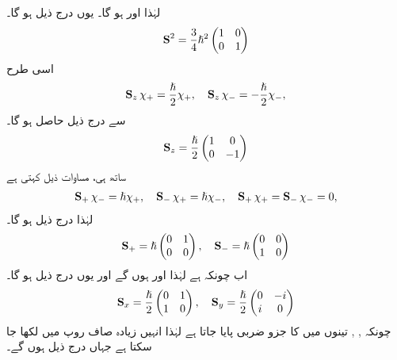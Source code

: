  لہٰذا  اور  ہو گا۔  یوں   درج ذیل ہو گا۔
 \begin{align} 
\operatorname{\mathbf{S}}^2= \frac{3}{4}\hslash^2 \begin{pmatrix} 1&0 \\ 0&1 \end{pmatrix} 
 \end{align} 
اسی طرح 
\begin{align} 
 \operatorname{\mathbf{S}}_{z}\chi_{+}=\frac{\hslash}{2}\chi_{+}, \quad \operatorname{\mathbf{S}}_{z} \chi_{-}=-\frac{\hslash}{2}\chi_{-}, 
 \end{align}
سے درج ذیل حاصل ہو گا۔
\begin{align}\label{مساوات_تین_ابعادی_زیڈ_چکری}
 \operatorname{\mathbf{S}}_{z}= \frac{\hslash}{2}\begin{pmatrix} 1&0 \\ 0&-1 \end{pmatrix} 
 \end{align}
ساتھ ہی،  مساوات    ذیل کہتی ہے
\begin{align*} 
 \operatorname{\mathbf{S}}_{+} \chi_{-}=\hslash \chi_+, \quad \operatorname{\mathbf{S}}_{-}\chi_{+}=\hslash \chi_- ,\quad  \operatorname{\mathbf{S}}_{+} \chi_{+}= \operatorname{\mathbf{S}}_{-} \chi_{-}=0, 
 \end{align*}
لہٰذا درج ذیل ہو گا۔
\begin{align}
 \operatorname{\mathbf{S}}_{+}=\hslash\begin{pmatrix} 0&1 \\ 0&0 \end{pmatrix} , \quad \operatorname{\mathbf{S}}_{-}=\hslash\begin{pmatrix}0&0 \\ 1&0 \end{pmatrix} 
 \end{align}
 اب     چونکہ   ہے لہٰذا     اور  ہوں گے اور یوں  درج ذیل ہو گا۔
\begin{align}\label{مساوات_تین_ابعادی_دو_چکری}  
 \operatorname{\mathbf{S}}_{x}=\frac{\hslash}{2}\begin{pmatrix} 0&1 \\1&0 \end{pmatrix} , \quad \operatorname{\mathbf{S}}_{y}=\frac{\hslash}{2}\begin{pmatrix} 0&-i \\ i& 0 \end{pmatrix}
 \end{align}
چونکہ  ,  ,  تینوں میں  کا جزو  ضربی پایا جاتا ہے لہٰذا انہیں زیادہ صاف روپ  میں  لکھا جا سکتا ہے جہاں درج ذیل ہوں گے۔

